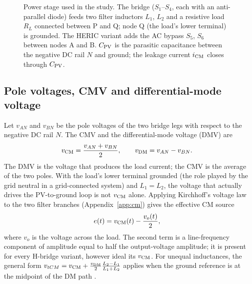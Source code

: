 \begin{figure}[!t]
{}
\caption{Power stage used in the study. The bridge ($S_1$--$S_4$, each with an anti-parallel diode) feeds two filter inductors $L_1$, $L_2$ and a resistive load $R_L$ connected between P and Q; node Q (the load's lower terminal) is grounded. The HERIC variant adds the AC bypass $S_5$, $S_6$ between nodes A and B. $C_{\mathrm{PV}}$ is the parasitic capacitance between the negative DC rail $N$ and ground; the leakage current $i_{\mathrm{CM}}$ closes through $C_{\mathrm{PV}}$.}
\label{fig:schematic}
\end{figure}

\subsection{Pole voltages, CMV and differential-mode voltage}
Let $v_{AN}$ and $v_{BN}$ be the pole voltages of the two bridge legs with respect to the negative DC rail $N$. The CMV and the differential-mode voltage (DMV) are
\begin{equation}
v_{\mathrm{CM}}=\frac{v_{AN}+v_{BN}}{2},\qquad v_{\mathrm{DM}}=v_{AN}-v_{BN}.
\label{eq:cmdm}
\end{equation}
The DMV is the voltage that produces the load current; the CMV is the average of the two poles. With the load's lower terminal grounded (the role played by the grid neutral in a grid-connected system) and $L_1=L_2$, the voltage that actually drives the PV-to-ground loop is not $v_{\mathrm{CM}}$ alone. Applying Kirchhoff's voltage law to the two filter branches (Appendix~\ref{app:cm}) gives the effective CM source
\begin{equation}
e(t)=v_{\mathrm{CM}}(t)-\frac{v_o(t)}{2},
\label{eq:tcm}
\end{equation}
where $v_o$ is the voltage across the load. The second term is a line-frequency component of amplitude equal to half the output-voltage amplitude; it is present for every H-bridge variant, however ideal its $v_{\mathrm{CM}}$. For unequal inductances, the general form $v_{tCM}=v_{\mathrm{CM}}+\tfrac{v_{\mathrm{DM}}}{2}\tfrac{L_2-L_1}{L_1+L_2}$ applies when the ground reference is at the midpoint of the DM path \cite{Gubia2007,Shrestha2025}.

